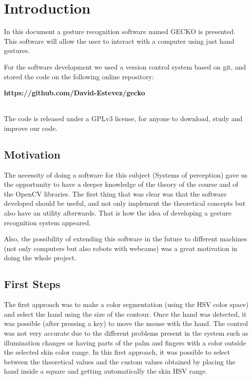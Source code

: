 \section{Introduction}
In this document a gesture recognition software named GECKO is presented. This software will allow the user to interact with a computer using just hand gestures. 

For the software development we used a version control system based on git, and stored the code on the following online repository:

\begin{center}
{\bfseries https://github.com/David-Estevez/gecko}
\end{center}
~\\
\noindent
The code is released under a GPLv3 license, for anyone to download, study and improve our code.

\subsection{Motivation}
The necessity of doing a software for this subject (Systems of perception) gave us the opportunity to have a deeper knowledge of the theory of the course and of the OpenCV libraries. The first thing that was clear was that the software developed should be useful, and not only implement the theoretical concepts but also have an utility afterwards. That is how the idea of developing a gesture recognition system appeared. 

Also, the possibility of extending this software in the future to different machines (not only computers but also robots with webcams) was a great motivation in doing the whole project. 


\subsection{First Steps}

The first approach was to make a color segmentation (using the HSV color space) and select the hand using the size of the contour. Once the hand was detected, it was possible (after pressing a key) to move the mouse with the hand. The control was not very accurate due to the different problems present in the system such as illumination changes or having parts of the palm and fingers with a color outside the selected skin color range. In this first approach, it was possible to select between the theoretical values and the custom values obtained by placing the hand inside a square and getting automatically the skin HSV range. 

